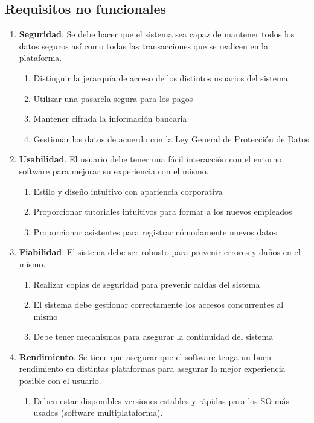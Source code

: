 \documentclass[10pt,a4paper]{article}
\begin{document}
{\subsection*{Requisitos no funcionales}
\begin{enumerate}
\item \textbf{Seguridad}. Se debe hacer que el sistema sea capaz de mantener todos los datos seguros así como todas las transacciones que se realicen en la plataforma.
\begin{enumerate}
\item Distinguir la jerarquía de acceso de los distintos usuarios del sistema
\item Utilizar una pasarela segura para los pagos
\item Mantener cifrada la información bancaria
\item Gestionar los datos de acuerdo con la Ley General de Protección de Datos
\end{enumerate}
\item \textbf{Usabilidad}. El usuario debe tener una fácil interacción con el entorno software para mejorar su experiencia con el mismo.
\begin{enumerate}
\item Estilo y diseño intuitivo con apariencia corporativa
\item Proporcionar tutoriales intuitivos para formar a los nuevos empleados
\item Proporcionar asistentes para registrar cómodamente nuevos datos
\end{enumerate}
\item \textbf{Fiabilidad}. El sistema debe ser robusto para prevenir errores y daños en el mismo.
\begin{enumerate}
\item Realizar copias de seguridad para prevenir caídas del sistema
\item El sistema debe gestionar correctamente los accesos concurrentes al mismo
\item Debe tener mecanismos para asegurar la continuidad del sistema
\end{enumerate}
\item \textbf{Rendimiento}. Se tiene que asegurar que el software tenga un buen rendimiento en distintas plataformas para asegurar la mejor experiencia posible con el usuario.\begin{enumerate}
\item Deben estar disponibles versiones estables y rápidas para los SO más usados (software multiplataforma).
\end{enumerate}
\end{enumerate}

}
\end{document}
